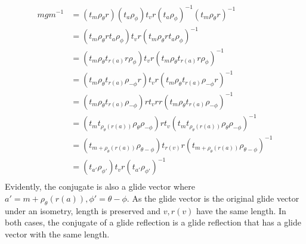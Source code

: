 \documentclass{article}
\begin{document}
\begin{equation}
    \begin{split}
        mgm^{-1} & = \left(t_m\rho_{\theta}r\right)\left(t_a\rho_{\phi}\right)t_vr\left(t_a\rho_{\phi}\right)^{-1}\left(t_m\rho_{\theta}r\right)^{-1} \\
        & = \left(t_m\rho_{\theta}rt_a\rho_{\phi}\right)t_vr\left(t_m\rho_{\theta}rt_a\rho_{\phi}\right)^{-1} \\
        & = \left(t_m\rho_{\theta}t_{r\left(a\right)}r\rho_{\phi}\right)t_vr\left(t_m\rho_{\theta}t_{r\left(a\right)}r\rho_{\phi}\right)^{-1} \\
        & = \left(t_m\rho_{\theta}t_{r\left(a\right)}\rho_{-\phi}r\right)t_vr\left(t_m\rho_{\theta}t_{r\left(a\right)}\rho_{-\phi}r\right)^{-1} \\
        & = \left(t_m\rho_{\theta}t_{r\left(a\right)}\rho_{-\phi}\right)rt_vrr\left(t_m\rho_{\theta}t_{r\left(a\right)}\rho_{-\phi}\right)^{-1} \\
        & = \left(t_mt_{\rho_{\theta}\left(r\left(a\right)\right)}\rho_{\theta}\rho_{-\phi}\right)rt_v\left(t_mt_{\rho_{\theta}\left(r\left(a\right)\right)}\rho_{\theta}\rho_{-\phi}\right)^{-1} \\
        & = \left(t_{m + \rho_{\theta}\left(r\left(a\right)\right)}\rho_{\theta - \phi}\right)t_{r\left(v\right)}r\left(t_{m + \rho_{\theta}\left(r\left(a\right)\right)}\rho_{\theta - \phi}\right)^{-1} \\
        & = \left(t_{a'}\rho_{\phi'}\right)t_vr\left(t_{a'}\rho_{\phi'}\right)^{-1} \\
    \end{split}
\end{equation}
Evidently, the conjugate is also a glide vector where $a' = m + \rho_{\theta}\left(r\left(a\right)\right), \phi' = \theta - \phi$. As the glide vector is the original glide vector under an isometry, length is preserved and $v, r\left(v\right)$ have the same length. In both cases, the conjugate of a glide reflection is a glide reflection that has a glide vector with the same length.

\clearpage
\end{document}
